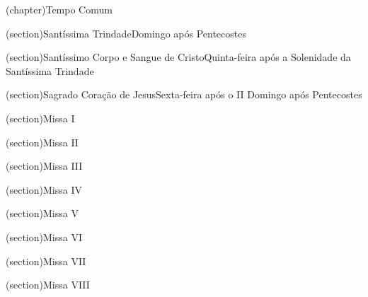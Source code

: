 
\upart(chapter){Tempo Comum}\label{chapter:tempus-per-annum}

\Solemnitas*(section){Santíssima Trindade}{Domingo após Pentecostes}\label{section:tempus-per-annum/sanctissimae-trinitatis}


\AllowPageFlush

\Solemnitas(section){Santíssimo Corpo e Sangue de Cristo}{Quinta-feira após a Solenidade da Santíssima Trindade}\label{section:tempus-per-annum/sanctissimi-corporis-et-sanguinis-christi}


\AllowPageFlush

\Solemnitas(section){Sagrado Coração de Jesus}{Sexta-feira após o II Domingo após Pentecostes}\label{section:tempus-per-annum/sacratissimi-cordis-iesu}


\AllowPageFlush

\uchapter(section){Missa I}\label{section:tempus-per-annum/missa-1}


\uchapter(section){Missa II}\label{section:tempus-per-annum/missa-2}


\AllowPageFlush

\uchapter(section){Missa III}\label{section:tempus-per-annum/missa-3}


\AllowPageFlush

\uchapter(section){Missa IV}\label{section:tempus-per-annum/missa-4}


\AllowPageFlush

\uchapter(section){Missa V}\label{section:tempus-per-annum/missa-5}


\uchapter(section){Missa VI}\label{section:tempus-per-annum/missa-6}


\AllowPageFlush

\uchapter(section){Missa VII}\label{section:tempus-per-annum/missa-7}


\AllowPageFlush

\uchapter(section){Missa VIII}\label{section:tempus-per-annum/missa-8}


